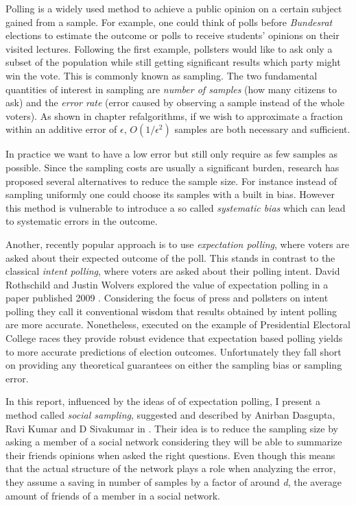 Polling is a widely used method to achieve a public opinion on a certain subject gained from a sample. For example, one could think of polls before \textit{Bundesrat} elections to estimate the outcome or polls to receive students' opinions on their visited lectures.
Following the first example, pollsters would like to ask only a subset of the population while still getting significant results which party might win the vote. This is commonly known as sampling.
The two fundamental quantities of interest in sampling are \textit{number of samples} (how many citizens to ask) and the \textit{error rate} (error caused by observing a sample instead of the whole voters). As shown in chapter ref{algorithms}, if we wish to approximate a fraction within an additive error of $\epsilon$, $O(1/\epsilon^{2})$ samples are both necessary and sufficient.

In practice we want to have a low error but still only require as few samples as possible.
Since the sampling costs are usually a significant burden, research has proposed several alternatives to reduce the sample size.
For instance instead of sampling uniformly one could choose its samples with a built in bias.
However this method is vulnerable to introduce a so called \textit{systematic bias} which can lead to systematic errors in the outcome.

Another, recently popular approach is to use \textit{expectation polling}, where voters are asked about their expected outcome of the poll. This stands in contrast to the classical \textit{intent polling}, where voters are asked about their polling intent. David Rothschild and Justin Wolvers explored the value of expectation polling in a paper published 2009 \cite{rothschild2009forecasting}. Considering the focus of press and pollsters on intent polling they call it conventional wisdom that results obtained by intent polling are more accurate. Nonetheless, executed on the example of Presidential Electoral College races they provide robust evidence that expectation based polling yields to more accurate predictions of election outcomes.
Unfortunately they fall short on providing any theoretical guarantees on either the sampling bias or sampling error.

In this report, influenced by the ideas of of expectation polling, I present a method called \textit{social sampling}, suggested and described by Anirban Dasgupta, Ravi Kumar and D Sivakumar in \cite{dasgupta2012social}.
Their idea is to reduce the sampling size by asking a member of a social network considering they will be able to summarize their friends opinions when asked the right questions.
Even though this means that the actual structure of the network plays a role when analyzing the error, they assume a saving in number of samples by a factor of around \textit{d}, the average amount of friends of a member in a social network.

